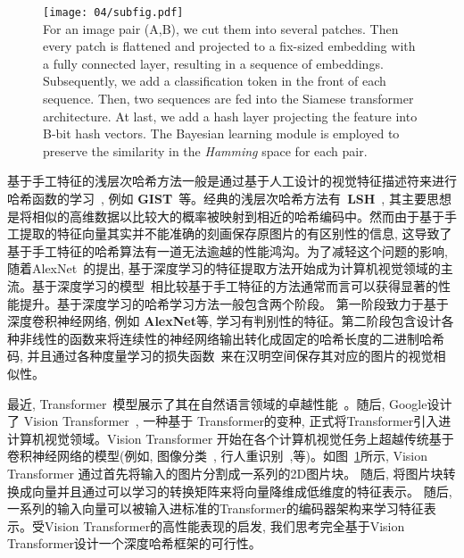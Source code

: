 \begin{figure}[!htp]
    \centering
    \texttt{[image: 04/subfig.pdf]} \\
      {For an image pair (A,B), we cut them into several patches. Then every patch is flattened and projected to a fix-sized embedding with a fully connected layer, resulting in a sequence of embeddings. Subsequently, we add a classification token in the front of each sequence. Then, two sequences are fed into the Siamese transformer architecture. At last, we add a hash layer projecting the feature into B-bit hash vectors. The Bayesian learning module is employed to preserve the similarity in the \textit{Hamming} space for each pair. }
   \label{fig:subfig}
\end{figure} 
基于手工特征的浅层次哈希方法一般是通过基于人工设计的视觉特征描述符来进行哈希函数的学习~\cite{charikar2002similarity, indyk1997locality, weiss2008spectral}, 例如 \textbf{GIST}~\cite{oliva2001modeling}等。经典的浅层次哈希方法有~\textbf{LSH}~\cite{indyk1997locality}, 其主要思想是将相似的高维数据以比较大的概率被映射到相近的哈希编码中。然而由于基于手工提取的特征向量其实并不能准确的刻画保存原图片的有区别性的信息, 这导致了基于手工特征的哈希算法有一道无法逾越的性能鸿沟。为了减轻这个问题的影响, 随着AlexNet~\cite{alexnet}的提出, 基于深度学习的特征提取方法开始成为计算机视觉领域的主流。基于深度学习的模型~\cite{dosovitskiy2020image, russakovsky2015imagenet}相比较基于手工特征的方法通常而言可以获得显著的性能提升。基于深度学习的哈希学习方法一般包含两个阶段。 第一阶段致力于基于深度卷积神经网络, 例如 \textbf{AlexNet}等, 学习有判别性的特征。第二阶段包含设计各种非线性的函数来将连续性的神经网络输出转化成固定的哈希长度的二进制哈希码, 并且通过各种度量学习的损失函数~\cite{cakir2019hashing,cao2018deep,erin2015deep,gong2012iterative, li2015feature}来在汉明空间保存其对应的图片的视觉相似性。 \par
最近, Transformer~\cite{vaswani2017attention}模型展示了其在自然语言领域的卓越性能~\cite{brown2020language, devlin2018bert}。随后, Google设计了 Vision Transformer~\cite{dosovitskiy2020image}, 一种基于 Transformer的变种, 正式将Transformer引入进计算机视觉领域。Vision Transformer 开始在各个计算机视觉任务上超越传统基于卷积神经网络的模型(例如, 图像分类~\cite{dosovitskiy2020image}, 行人重识别~\cite{he2021transreid},等)。如图~\ref{fig:subfig}所示, Vision Transformer 通过首先将输入的图片分割成一系列的2D图片块。 随后, 将图片块转换成向量并且通过可以学习的转换矩阵来将向量降维成低维度的特征表示。 随后, 一系列的输入向量可以被输入进标准的Transformer的编码器架构来学习特征表示。受Vision Transformer的高性能表现的启发, 我们思考完全基于Vision Transformer设计一个深度哈希框架的可行性。\par
